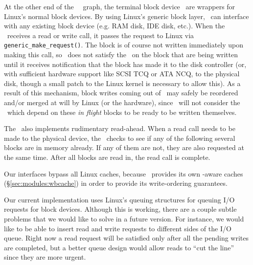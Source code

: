 At the other end of the \Kudos\ \module\ graph, the terminal block device
\modules\ are wrappers for Linux's normal block devices. By using Linux's
generic block layer, \Kudos\ can interface with any existing block device (e.g.
RAM disk, IDE disk, etc.). When the \module\ receives a read or write call, it
passes the request to Linux via \texttt{generic\_make\_request()}. The block is
of course not written immediately upon making this call, so \Kudos\ does not
satisfy the \chdescs\ on the block that are being written until it receives
notification that the block has made it to the disk controller (or, with
sufficient hardware support like SCSI TCQ or ATA NCQ, to the physical disk,
though a small patch to the Linux kernel is necessary to allow this). As a
result of this mechanism, block writes coming out of \Kudos\ may safely be
reordered and/or merged at will by Linux (or the hardware), since \Kudos\ will
not consider the \chdescs\ which depend on these \emph{in flight} blocks to be
ready to be written themselves.

The \module\ also implements rudimentary read-ahead. When a read call needs to
be made to the physical device, the \module\ checks to see if any of the
following several blocks are in memory already. If any of them are not, they are
also requested at the same time. After all blocks are read in, the read call is
complete.

Our interfaces bypass all Linux caches, because \Kudos\ provides its own
\chdesc-aware caches (\S\ref{sec:modules:wbcache}) in order to provide its
write-ordering guarantees.

Our current implementation uses Linux's queuing structures for queuing I/O
requests for block devices. Although this is working, there are a couple subtle
problems that we would like to solve in a future version. For instance, we
would like to be able to insert read and write requests to different sides of
the I/O queue. Right now a read request will be satisfied only after all the
pending writes are completed, but a better queue design would allow reads to
``cut the line'' since they are more urgent. 
